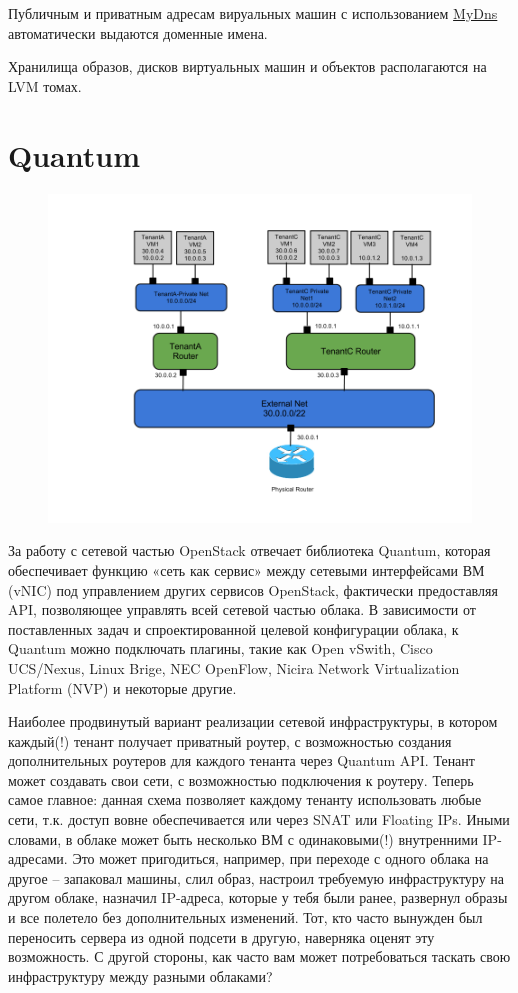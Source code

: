 \documentclass[letterpaper,10pt,russian]{sphinxmanual}
\begin{document}
Публичным и приватным адресам вируальных машин с использованием \href{http://mydns.bboy.net/}{MyDns} автоматически выдаются доменные имена.

Хранилища образов, дисков виртуальных машин и объектов располагаются на LVM томах.


\section{Quantum}
\label{index:quantum}\begin{figure}[htbp]
\centering

\includegraphics{quantum.png}
\end{figure}

За работу с сетевой частью OpenStack отвечает библиотека Quantum, которая обеспечивает функцию «сеть как сервис» между сетевыми интерфейсами ВМ (vNIC) под управлением других сервисов OpenStack, фактически предоставляя API, позволяющее управлять всей сетевой частью облака. В зависимости от поставленных задач и спроектированной целевой конфигурации облака, к Quantum можно подключать плагины, такие как Open vSwith, Cisco UCS/Nexus, Linux Brige, NEC OpenFlow, Nicira Network Virtualization Platform (NVP) и некоторые другие.

Наиболее продвинутый вариант реализации сетевой инфраструктуры, в котором каждый(!) тенант получает приватный роутер, с возможностью создания дополнительных роутеров для каждого тенанта через Quantum API. Тенант может создавать свои сети, с возможностью подключения к роутеру. Теперь самое главное: данная схема позволяет каждому тенанту использовать любые сети, т.к. доступ вовне обеспечивается или через SNAT или Floating IPs. Иными словами, в облаке может быть несколько ВМ с одинаковыми(!) внутренними IP-адресами. Это может пригодиться, например, при переходе с одного облака на другое – запаковал машины, слил образ, настроил требуемую инфраструктуру на другом облаке, назначил IP-адреса, которые у тебя были ранее, развернул образы и все полетело без дополнительных изменений. Тот, кто часто вынужден был переносить сервера из одной подсети в другую, наверняка оценят эту возможность. С другой стороны, как часто вам может потребоваться таскать свою инфраструктуру между разными облаками?
\end{document}
